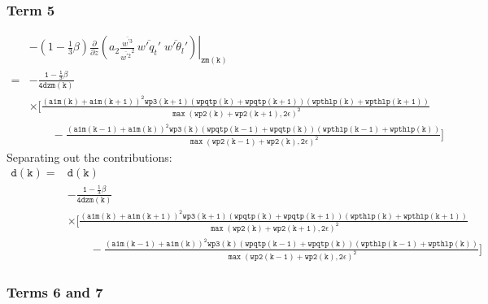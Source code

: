 \documentclass[11pt,fleqn]{article}
\newcommand{\ptlder}[2]{\frac{\partial #1}{\partial #2}}
\begin{document}
\subsubsection{Term 5}

\begin{equation}
\begin{split}
& - \left. \left( 1 - \frac{1}{3}\beta \right)
       \ptlder{}{z}
         \left( 
           a_2
           \frac{\overline{w^{'3}}}{\overline{w^{'2}}^2} \,
           \overline{w'q_t'} \; \overline{w'\theta_l'}
         \right) \right|_{\mathtt{zm(k)}} \\
=& \mathtt{
   - \frac{1 - \frac{1}{3}\beta}{4 dzm(k)} } \\
 & \mathtt{
     \times \bigg[ \frac{\left(a1m(k)+a1m(k+1)\right)^2 wp3(k+1) 
                  \left(wpqtp(k)+wpqtp(k+1)\right)\left(wpthlp(k)+wpthlp(k+1)\right)}
                 {\max\left(wp2(k)+wp2(k+1),2\epsilon\right)^2} } \\
 & \mathtt{ \quad \quad
           -\frac{\left(a1m(k-1)+a1m(k)\right)^2 wp3(k) 
                  \left(wpqtp(k-1)+wpqtp(k)\right)\left(wpthlp(k-1)+wpthlp(k)\right)}
                 {\max\left(wp2(k-1)+wp2(k),2\epsilon\right)^2}
     \bigg]
   }
\end{split}
\end{equation}
%
Separating out the contributions:
%
\begin{equation}
\begin{split}
\mathtt{d(k)} =& \mathtt{d(k)} \\
 & \mathtt{ - \frac{1 - \frac{1}{3}\beta}{4 dzm(k)} } \\
 & \mathtt{ \times 
      \bigg[ \frac{\left(a1m(k)+a1m(k+1)\right)^2 wp3(k+1) 
                   \left(wpqtp(k)+wpqtp(k+1)\right) 
                   \left(wpthlp(k)+wpthlp(k+1)\right)}
                  {\max\left(wp2(k)+wp2(k+1),2\epsilon\right)^2} } \\
 & \mathtt{ \quad \quad
            -\frac{\left(a1m(k-1)+a1m(k)\right)^2 wp3(k) 
                   \left(wpqtp(k-1)+wpqtp(k)\right) 
                   \left(wpthlp(k-1)+wpthlp(k)\right)}
                  {\max\left(wp2(k-1)+wp2(k),2\epsilon\right)^2}
      \bigg]
   }
\end{split}
\end{equation}

\subsubsection{Terms 6 and 7}
\end{document}
